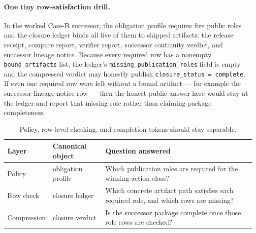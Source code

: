 \documentclass[11pt]{article}
\begin{document}
\paragraph{One tiny row-satisfaction drill.}
In the worked Case-B successor, the obligation profile requires five public roles and the closure ledger binds all five of them to shipped artifacts: the release receipt, compare report, verifier report, successor continuity verdict, and successor lineage notice. Because every required row has a nonempty \texttt{bound\_artifacts} list, the ledger's \texttt{missing\_publication\_roles} field is empty and the compressed verdict may honestly publish \texttt{closure\_status = complete}. If even one required row were left without a bound artifact --- for example the successor lineage notice row --- then the honest public answer here would stay at the ledger and report that missing role rather than claiming package completeness.\cite{series:workedexample}

\begin{table}[t]
\centering
\small
\begin{tabularx}{\linewidth}{@{}l l X@{}}
\toprule
Layer & Canonical object & Question answered \\
\midrule
Policy & obligation profile & Which publication roles are required for the winning action class? \\
Row check & closure ledger & Which concrete artifact path satisfies each required role, and which rows are missing? \\
Compression & closure verdict & Is the successor package complete once those role rows are checked? \\
\bottomrule
\end{tabularx}
\caption{Policy, row-level checking, and completion tokens should stay separable.}
\label{tab:layers}
\end{table}
\end{document}
